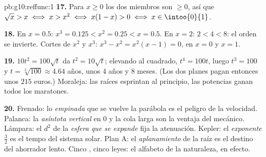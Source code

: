 \begin{solution}{pb:g10:reffunc:1}
\textbf{17.} Para $x \geq 0$ los dos miembros son $\geq 0$, así que
$\sqrt x > x \iff x > x^2 \iff x(1 - x) > 0 \iff x \in \intoo{0}{1}$.

\textbf{18.} En $x = 0.5$: $x^3 = 0.125 < x^2 = 0.25 < x = 0.5$. En
$x = 2$: $2 < 4 < 8$: el orden se invierte. Cortes de $x^2$ y $x^3$:
$x^3 - x^2 = x^2(x - 1) = 0$, en $x = 0$ y $x = 1$.

\textbf{19.} $10t^2 = 100\sqrt t$ da $t^2 = 10\sqrt t$; elevando al
cuadrado, $t^4 = 100t$, luego $t^3 = 100$ y
$t = \sqrt[3]{100} \approx 4.64$ años, unos $4$ años y $8$ meses. (Los dos
planes pagan entonces unos $215$ euros.) Moraleja: las raíces esprintan al
principio, las potencias ganan todos los maratones.

\textbf{20.} Frenado: lo \emph{empinada} que se vuelve la parábola es el
peligro de la velocidad. Palanca: la \emph{asíntota vertical} en $0$ y la
cola larga son la ventaja del mecánico. Lámpara: el $d^2$ de la
\emph{esfera que se expande} fija la atenuación. Kepler: el
\emph{exponente} $\frac32$ es el tempo del sistema solar. Plan A: el
\emph{aplanamiento} de la raíz es el destino del ahorrador lento. Cinco
, cinco leyes: el alfabeto de la naturaleza, en efecto.
\end{solution}
